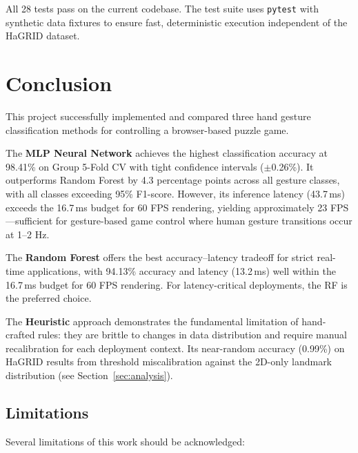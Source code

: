 \documentclass[11pt,a4paper]{article}
\begin{document}
All 28 tests pass on the current codebase. The test suite uses \texttt{pytest} with synthetic data fixtures to ensure fast, deterministic execution independent of the HaGRID dataset.

\section{Conclusion}
\label{sec:conclusion}

This project successfully implemented and compared three hand gesture classification methods for controlling a browser-based puzzle game.

The \textbf{MLP Neural Network} achieves the highest classification accuracy at 98.41\% on Group 5-Fold CV with tight confidence intervals ($\pm$0.26\%). It outperforms Random Forest by 4.3 percentage points across all gesture classes, with all classes exceeding 95\% F1-score. However, its inference latency (43.7\,ms) exceeds the 16.7\,ms budget for 60 FPS rendering, yielding approximately 23 FPS---sufficient for gesture-based game control where human gesture transitions occur at 1--2 Hz.

The \textbf{Random Forest} offers the best accuracy--latency tradeoff for strict real-time applications, with 94.13\% accuracy and latency (13.2\,ms) well within the 16.7\,ms budget for 60 FPS rendering. For latency-critical deployments, the RF is the preferred choice.

The \textbf{Heuristic} approach demonstrates the fundamental limitation of hand-crafted rules: they are brittle to changes in data distribution and require manual recalibration for each deployment context. Its near-random accuracy (0.99\%) on HaGRID results from threshold miscalibration against the 2D-only landmark distribution (see Section~\ref{sec:analysis}).

\subsection{Limitations}

Several limitations of this work should be acknowledged:
\end{document}
